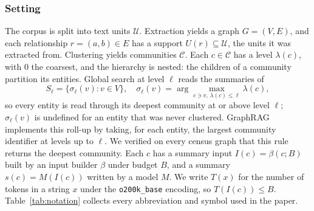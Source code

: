 \documentclass{ieeeaccess}
\theoremstyle{remark}
\newcommand{\Sel}{\sigma_\ell}
\newcommand{\In}{I}
\newcommand{\tok}{T}
\begin{document}
\subsubsection{Setting}
The corpus is split into text units $\mathcal U$. Extraction yields a graph $G=(V,E)$, and each relationship $r=(a,b)\in E$ has a support $U(r)\subseteq\mathcal U$, the units it was extracted from. Clustering yields communities $\mathcal C$. Each $c\in\mathcal C$ has a level $\lambda(c)$, with $0$ the coarsest, and the hierarchy is nested: the children of a community partition its entities. Global search at level $\ell$ reads the summaries of
\begin{equation}
S_\ell=\{\Sel(v): v\in V\},\quad \Sel(v)=\arg\max_{c\ni v,\ \lambda(c)\le\ell}\lambda(c),
\end{equation}
so every entity is read through its deepest community at or above level $\ell$; $\Sel(v)$ is undefined for an entity that was never clustered. GraphRAG implements this roll-up by taking, for each entity, the largest community identifier at levels up to $\ell$. We verified on every census graph that this rule returns the deepest community. Each $c$ has a summary input $\In(c)=\beta(c;B)$ built by an input builder $\beta$ under budget $B$, and a summary $s(c)=M(\In(c))$ written by a model $M$. We write $\tok(x)$ for the number of tokens in a string $x$ under the \texttt{o200k\_base} encoding, so $\tok(\In(c))\le B$. Table~\ref{tab:notation} collects every abbreviation and symbol used in the paper.
\end{document}
